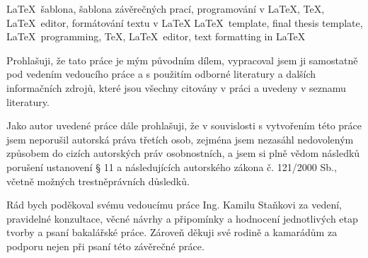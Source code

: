 \documentclass[12pt,a4paper,twoside]{book}
\begin{document}
\klicovaslova
{\LaTeX\ šablona, šablona závěrečných prací, programování v \LaTeX, \TeX, \LaTeX\ editor, formátování textu v \LaTeX}
{\LaTeX\ template, final thesis template, \LaTeX\ programming, \TeX, \LaTeX\ editor, text formatting in \LaTeX}

\citace

\prohlaseni
{Prohlašuji, že tato práce je mým původním dílem, vypracoval jsem ji samostatně pod vedením vedoucího práce a s použitím odborné literatury a dalších informačních zdrojů, které jsou všechny citovány v práci a uvedeny v seznamu literatury.

Jako autor uvedené práce dále prohlašuji, že v souvislosti s vytvořením této práce jsem neporušil autorská práva třetích osob, zejména jsem nezasáhl nedovoleným způsobem do cizích autorských práv osobnostních, a jsem si plně vědom následků porušení ustanovení § 11 a následujících autorského zákona č. 121/2000 Sb., včetně možných trestněprávních důsledků.}

\podekovani
{Rád bych poděkoval svému vedoucímu práce Ing. Kamilu Staňkovi za vedení, pravidelné konzultace, věcné návrhy a připomínky a hodnocení jednotlivých etap tvorby a psaní bakalářské práce. Zároveň děkuji své rodině a kamarádům za podporu nejen při psaní této závěrečné práce.}

\obsah








\end{document}
